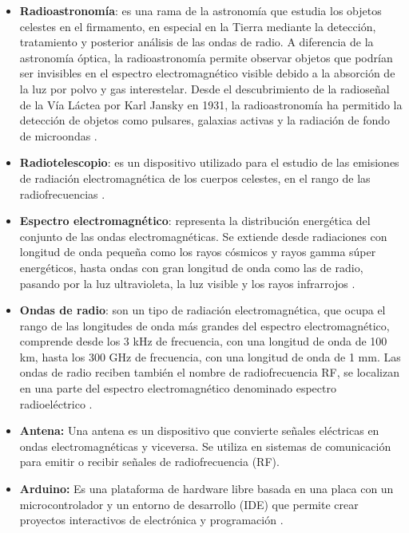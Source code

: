 
\begin{itemize}
    \item \textbf{Radioastronomía}: es una rama de la astronomía que estudia los objetos celestes
    en el firmamento, en especial en la Tierra mediante la detección, tratamiento
    y posterior análisis de las ondas de radio.
    A diferencia de la astronomía óptica, la radioastronomía permite observar
    objetos que podrían ser invisibles en el espectro electromagnético visible
    debido a la absorción de la luz por polvo y gas interestelar. Desde el
    descubrimiento de la radioseñal de la Vía Láctea por Karl Jansky en 1931, la
    radioastronomía ha permitido la detección de objetos como pulsares, galaxias
    activas y la radiación de fondo de microondas \cite{wilson2013radioastronomy}.

    \item \textbf{Radiotelescopio}: es un dispositivo utilizado para el estudio de las emisiones de
    radiación electromagnética de los cuerpos celestes, en el rango de las radiofrecuencias 
    \cite{ordonez2018radiotelescopio}.

    \item \textbf{Espectro electromagnético}: representa la distribución energética del conjunto de las
    ondas electromagnéticas. Se extiende desde radiaciones con longitud de onda pequeña
    como los rayos cósmicos y rayos gamma súper energéticos, hasta ondas con gran longitud
    de onda como las de radio, pasando por la luz ultravioleta, la luz visible y los rayos
    infrarrojos \cite{ordonez2018radiotelescopio}.

    \item \textbf{Ondas de radio}: son un tipo de radiación electromagnética, que ocupa el rango de
    las longitudes de onda más grandes del espectro electromagnético, comprende desde
    los 3 kHz de frecuencia, con una longitud de onda de 100 km, hasta los 300 GHz de
    frecuencia, con una longitud de onda de 1 mm. Las ondas de radio reciben también el
    nombre de radiofrecuencia RF, se localizan en una parte del espectro electromagnético
    denominado espectro radioeléctrico \cite{ventanas2017ondas}.

    \item \textbf{Antena:} Una antena es un dispositivo que convierte
    señales eléctricas en ondas electromagnéticas y viceversa. Se
    utiliza en sistemas de comunicación para emitir o recibir señales
    de radiofrecuencia (RF). \cite{kraus-1950}
    \item \textbf{Arduino:} Es una plataforma de hardware libre basada 
        en una placa con un microcontrolador y un entorno de desarrollo
    (IDE) que permite crear proyectos interactivos de electrónica y
    programación \cite{arduino}.


\end{itemize}
